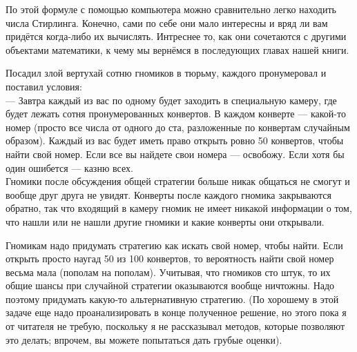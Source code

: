 По этой формуле с помощью компьютера можно сравнительно легко находить числа Стирлинга. Конечно, сами по себе они мало интересны и вряд ли вам придётся когда-либо их вычислять. Интреснее то, как они сочетаются с другими объектами математики, к чему мы вернёмся в последующих главах нашей книги.

\begin{exercise}
Посадил злой вертухай сотню гномиков в тюрьму, каждого пронумеровал и поставил условия:\\
— Завтра каждый из вас по одному будет заходить в специальную камеру, где будет лежать сотня пронумерованных конвертов. В каждом конверте — какой-то номер (просто все числа от одного до ста, разложенные по конвертам случайным образом). Каждый из вас будет иметь право открыть ровно 50 конвертов, чтобы найти свой номер. Если все вы найдете свои номера — освобожу. Если хотя бы один ошибется — казню всех.\\
Гномики после обсуждения общей стратегии больше никак общаться не смогут и вообще друг друга не увидят. Конверты после каждого гномика закрываются обратно, так что входящий в камеру гномик не имеет никакой информации о том, что нашли или не нашли другие гномики и какие конверты они открывали.

Гномикам надо придумать стратегию как искать свой номер, чтобы найти. Если открыть просто наугад 50 из 100 конвертов, то вероятность найти свой номер весьма мала (пополам на пополам). Учитывая, что гномиков сто штук, то их общие шансы при случайной стратегии оказываются вообще ничтожны. Надо поэтому придумать какую-то альтернативную стратегию. (По хорошему в этой задаче еще надо проанализировать в конце полученное решение, но этого пока я от читателя не требую, поскольку я не рассказывал методов, которые позволяют это делать; впрочем, вы можете попытаться дать грубые оценки).
\end{exercise}
